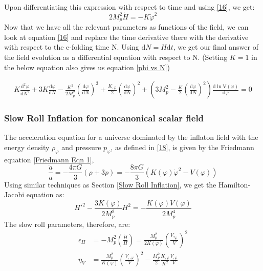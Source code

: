 \documentclass[aps,prd,reprint,preprintnumbers,showpacs,floatfix,nofootinbib,superscript address]{revtex4-2}
\begin{document}
Upon differentiating this expression with respect to time and using \ref{16}, we get:
\begin{equation} \label{20}
    2 M_p^2 \dot{H} = -  K \dot{\varphi}^2
\end{equation}
Now that we have all the relevant parameters as functions of the field, we can look at equation \ref{16} and replace the time derivative there with the derivative with respect to the e-folding time N. Using $\text{d}N = H \text{d}t$, we get our final answer of the field evolution as a differential equation with respect to N. (Setting $K = 1$ in the below equation also gives us equation \ref{phi vs N})
\begin{widetext}
\begin{subequations}
\begin{align}\label{Kphi vs N}
    K\frac{\text{d}^2\varphi}{\text{d}N^2} +3 K \frac{\text{d}\varphi}{\text{d}N}  - \frac{K^2}{2M_p^2} \left(\frac{\text{d}\varphi}{\text{d}N} \right)^3  +  \frac{K_{,\varphi}}{2}  \left(\frac{\text{d}\varphi}{\text{d}N} \right)^2 +  \left( 3 M_p^2 - \frac{K}{2} \left(\frac{\text{d}\varphi}{\text{d}N} \right)^2 \right) \frac{\text{d}\ln \text{V}(\varphi)}{\text{d} \varphi} = 0    
\end{align}
\end{subequations}
\end{widetext}
\subsubsection{Slow Roll Inflation for noncanonical scalar field}
The acceleration equation for a universe dominated by the inflaton field with the energy density $\rho_{\varphi}$ and pressure $p_{\varphi}$, as defined in \ref{18}, is given by the Friedmann equation \ref{Friedmann Eqn 1},
\begin{equation}
    \frac{\ddot{a}}{a} = -\frac{4\pi G}{3} (\rho +3p) = -\frac{8\pi G}{3} (K(\varphi){\dot{\varphi}}^2 - V(\varphi)) 
\end{equation}
Using similar techniques as Section \ref{Slow Roll Inflation}, we get the Hamilton-Jacobi equation as: 
\begin{equation}    \label{KHJ}
    H'^2 - \frac{3K(\varphi)}{2M_p^2}H^2 = - \frac{K(\varphi) V(\varphi)}{2M_p^4} 
\end{equation}
The slow roll parameters, therefore, are:
\begin{align}
    \epsilon_H &= - M_p^2 \left(\frac{\dot{H}}{H} \right) = \frac{M_p^2}{2 K(\varphi)} \left(\frac{V,_\varphi}{V}\right)^2 \\
    \eta_V &= \frac{M_p^2}{K(\varphi)} \left( \frac{V_{,,\varphi}}{V} \right)^2 - \frac{M_p^2}{2} \frac{K_{,\varphi}}{K^2} \frac{V_{,\varphi}}{V}
\end{align}
\end{document}
